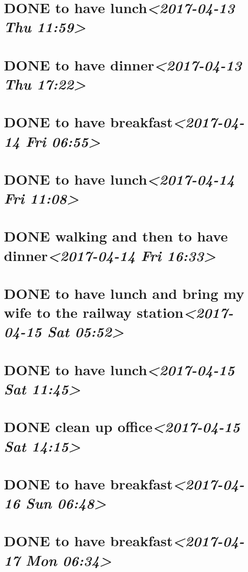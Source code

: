 \documentclass[cyan]{elegantnote}
\begin{document}
\section{{\bfseries\sffamily DONE} to have lunch\textit{<2017-04-13 Thu 11:59>}}
\label{sec:org2165ff9}
\section{{\bfseries\sffamily DONE} to have dinner\textit{<2017-04-13 Thu 17:22>}}
\label{sec:orgfd6e1ea}
\section{{\bfseries\sffamily DONE} to have breakfast\textit{<2017-04-14 Fri 06:55>}}
\label{sec:orgca44129}
\section{{\bfseries\sffamily DONE} to have lunch\textit{<2017-04-14 Fri 11:08>}}
\label{sec:orgbd6948d}
\section{{\bfseries\sffamily DONE} walking and then to have dinner\textit{<2017-04-14 Fri 16:33>}}
\label{sec:orgd9cbd02}
\section{{\bfseries\sffamily DONE} to have lunch and bring my wife to the railway station\textit{<2017-04-15 Sat 05:52>}}
\label{sec:orgcdffd99}
\section{{\bfseries\sffamily DONE} to have lunch\textit{<2017-04-15 Sat 11:45>}}
\label{sec:org4a3dbbe}
\section{{\bfseries\sffamily DONE} clean up office\textit{<2017-04-15 Sat 14:15>}}
\label{sec:org113d77a}
\section{{\bfseries\sffamily DONE} to have breakfast\textit{<2017-04-16 Sun 06:48>}}
\label{sec:org28e3f0f}
\section{{\bfseries\sffamily DONE} to have breakfast\textit{<2017-04-17 Mon 06:34>}}
\label{sec:org75876c6}
\end{document}
